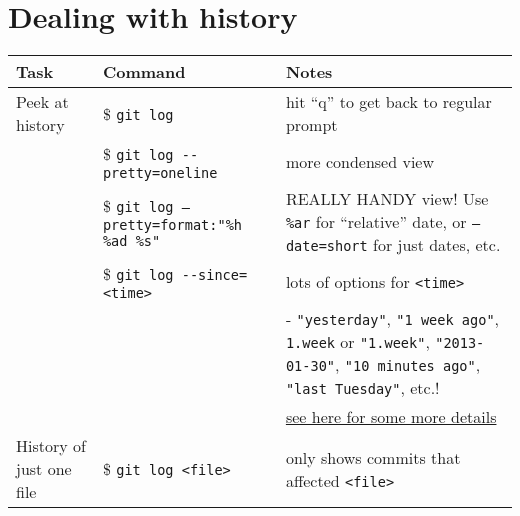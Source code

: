 \documentclass[]{article}
\begin{document}
\section*{Dealing with history}
\label{sec-3}


\begin{center}
\begin{tabular}{llp{2.5in}}
 Task                           &  Command                                             &  Notes                                                                                                                                                                  \\
\hline
 Peek at history                &  \$ \texttt{git log}                                 &  hit ``q'' to get back to regular prompt                                                                                                                                \\
                                &  \$ \texttt{git log -{}-pretty=oneline}              &  more condensed view                                                                                                                                                    \\
                                &  \$ \texttt{git log --pretty=format:"\%h \%ad \%s"}  &  REALLY HANDY view! Use \texttt{\%ar} for ``relative'' date, or \texttt{--date=short} for just dates, etc.                                                              \\
                                &  \$ \texttt{git log -{}-since=<time>}                &  lots of options for \texttt{<time>}                                                                                                                                    \\
                                &                                                      &  - \texttt{"yesterday"}, \texttt{"1 week ago"}, \texttt{1.week} or \texttt{"1.week"}, \texttt{"2013-01-30"}, \texttt{"10 minutes ago"}, \texttt{"last Tuesday"}, etc.!  \\
                                &                                                      &  \href{http://www.alexpeattie.com/blog/working-with-dates-in-git/}{see here for some more details}                                                                      \\
 History of just one file       &  \$ \texttt{git log <file>}                          &  only shows commits that affected \texttt{<file>}                                                                                                                       \\

\end{tabular}
\end{center}
\end{document}
